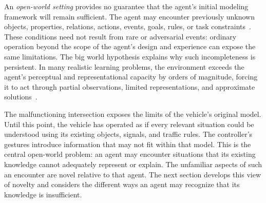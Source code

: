 An \emph{open-world setting} provides no guarantee that the agent's initial modeling framework will remain sufficient.
The agent may encounter previously unknown objects, properties, relations, actions, events, goals, rules, or task constraints~\citep{langley2020open,boult2021towards}.
These conditions need not result from rare or adversarial events: ordinary operation beyond the scope of the agent's design and experience can expose the same limitations.
The big world hypothesis explains why such incompleteness is persistent.
In many realistic learning problems, the environment exceeds the agent's perceptual and representational capacity by orders of magnitude, forcing it to act through partial observations, limited representations, and approximate solutions~\citep{javed2024bigworld}.

The malfunctioning intersection exposes the limits of the vehicle's original model.
Until this point, the vehicle has operated as if every relevant situation could be understood using its existing objects, signals, and traffic rules.
The controller's gestures introduce information that may not fit within that model.
This is the central open-world problem: an agent may encounter situations that its existing knowledge cannot adequately represent or explain.
The unfamiliar aspects of such an encounter are novel relative to that agent.
The next section develops this view of novelty and considers the different ways an agent may recognize that its knowledge is insufficient.

